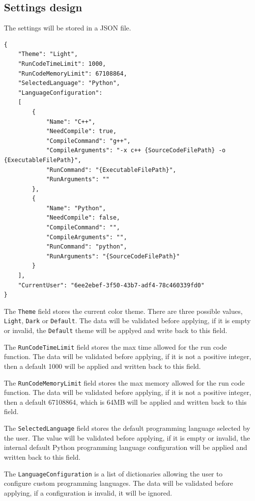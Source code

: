\documentclass[a4paper]{report}
\begin{document}
\subsection{Settings design}

The settings will be stored in a JSON file.

\begin{verbatim}
{
    "Theme": "Light",
    "RunCodeTimeLimit": 1000,
    "RunCodeMemoryLimit": 67108864,
    "SelectedLanguage": "Python",
    "LanguageConfiguration": 
    [
        {
            "Name": "C++",
            "NeedCompile": true,
            "CompileCommand": "g++",
            "CompileArguments": "-x c++ {SourceCodeFilePath} -o {ExecutableFilePath}",
            "RunCommand": "{ExecutableFilePath}",
            "RunArguments": ""
        },
        {
            "Name": "Python",
            "NeedCompile": false,
            "CompileCommand": "",
            "CompileArguments": "",
            "RunCommand": "python",
            "RunArguments": "{SourceCodeFilePath}"
        }
    ],
    "CurrentUser": "6ee2ebef-3f50-43b7-adf4-78c460339fd0"
}
\end{verbatim}

The \verb|Theme| field stores the current color theme. There are three possible values, \verb|Light|, \verb|Dark| or \verb|Default|. The data will be validated before applying, if it is empty or invalid, the \verb|Default| theme will be applyed and write back to this field.

The \verb|RunCodeTimeLimit| field stores the max time allowed for the run code function. The data will be validated before applying, if it is not a positive integer, then a default 1000 will be applied and written back to this field. 

The \verb|RunCodeMemoryLimit| field stores the max memory allowed for the run code function. The data will be validated before applying, if it is not a positive integer, then a default 67108864, which is 64MB will be applied and written back to this field.

The \verb|SelectedLanguage| field stores the default programming language selected by the user. The value will be validated before applying, if it is empty or invalid, the internal default Python programming language configuration will be applied and written back to this field.

The \verb|LanguageConfiguration| is a list of dictionaries allowing the user to configure custom programming languages. The data will be validated before applying, if a configuration is invalid, it will be ignored.
\end{document}
